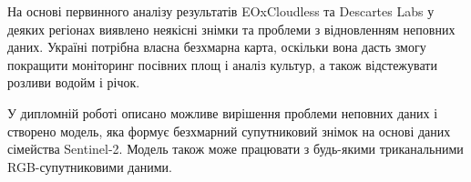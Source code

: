 На основі первинного аналізу результатів %
EOxCloudless та Descartes Labs у деяких
регіонах виявлено неякісні знімки та проблеми %
з відновленням неповних даних.  Україні
потрібна власна безхмарна карта, оскільки вона %
дасть змогу покращити моніторинг посівних
площ і аналіз культур, а також відстежувати %
розливи водойм і річок.

У дипломній роботі описано можливе вирішення %
проблеми неповних даних і створено модель,
яка формує безхмарний супутниковий знімок на %
основі даних сімейства Sentinel-2.  Модель
також може працювати з будь-якими %
триканальними RGB-супутниковими даними.
